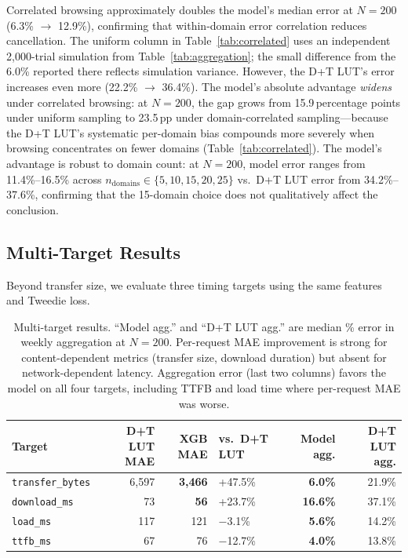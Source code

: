 \documentclass[sigconf,nonacm]{acmart}
\begin{document}
Correlated browsing approximately doubles the model's median error at $N=200$ (6.3\% $\to$ 12.9\%), confirming that within-domain error correlation reduces cancellation.
The uniform column in Table~\ref{tab:correlated} uses an independent 2,000-trial simulation from Table~\ref{tab:aggregation}; the small difference from the 6.0\% reported there reflects simulation variance.
However, the D+T LUT's error increases even more (22.2\% $\to$ 36.4\%).
The model's absolute advantage \emph{widens} under correlated browsing: at $N=200$, the gap grows from 15.9\,percentage points under uniform sampling to 23.5\,pp under domain-correlated sampling---because the D+T LUT's systematic per-domain bias compounds more severely when browsing concentrates on fewer domains (Table~\ref{tab:correlated}).
The model's advantage is robust to domain count: at $N=200$, model error ranges from 11.4\%--16.5\% across $n_{\text{domains}} \in \{5, 10, 15, 20, 25\}$ vs.\ D+T LUT error from 34.2\%--37.6\%, confirming that the 15-domain choice does not qualitatively affect the conclusion.

\subsection{Multi-Target Results}
\label{sec:multi-target}

Beyond transfer size, we evaluate three timing targets using the same features and Tweedie loss.

\begin{table}[t]
\centering
\small
\begin{tabular}{lrrlrr}
\toprule
Target & D+T LUT MAE & XGB MAE & vs.\ D+T LUT & Model agg. & D+T LUT agg. \\
\midrule
\texttt{transfer\_bytes} & 6,597 & \textbf{3,466} & +47.5\% & \textbf{6.0\%} & 21.9\% \\
\texttt{download\_ms} & 73 & \textbf{56} & +23.7\% & \textbf{16.6\%} & 37.1\% \\
\texttt{load\_ms} & 117 & 121 & $-$3.1\% & \textbf{5.6\%} & 14.2\% \\
\texttt{ttfb\_ms} & 67 & 76 & $-$12.7\% & \textbf{4.0\%} & 13.8\% \\
\bottomrule
\end{tabular}
\caption{Multi-target results. ``Model agg.'' and ``D+T LUT agg.'' are median \% error in weekly aggregation at $N\!=\!200$. Per-request MAE improvement is strong for content-dependent metrics (transfer size, download duration) but absent for network-dependent latency. Aggregation error (last two columns) favors the model on all four targets, including TTFB and load time where per-request MAE was worse.}
\label{tab:multi-target}
\end{table}
\end{document}
